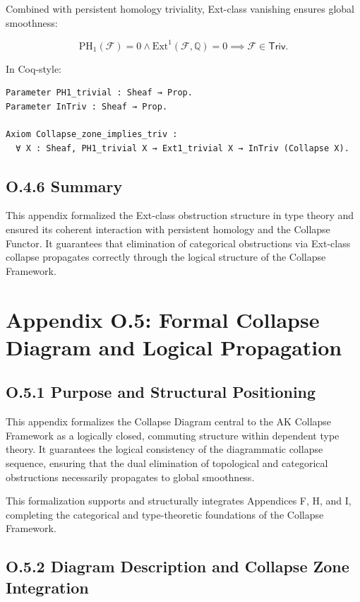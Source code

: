 \documentclass[11pt]{article}
\begin{document}
Combined with persistent homology triviality, Ext-class vanishing ensures global smoothness:

\[
\mathrm{PH}_1(\mathcal{F}) = 0 \land \mathrm{Ext}^1(\mathcal{F}, \mathbb{Q}) = 0 \implies \mathcal{F} \in \mathsf{Triv}.
\]

In Coq-style:

\begin{lstlisting}[language=Coq]
Parameter PH1_trivial : Sheaf → Prop.
Parameter InTriv : Sheaf → Prop.

Axiom Collapse_zone_implies_triv :
  ∀ X : Sheaf, PH1_trivial X → Ext1_trivial X → InTriv (Collapse X).
\end{lstlisting}

\subsection*{O.4.6 Summary}

This appendix formalized the Ext-class obstruction structure in type theory and ensured its coherent interaction with persistent homology and the Collapse Functor.  
It guarantees that elimination of categorical obstructions via Ext-class collapse propagates correctly through the logical structure of the Collapse Framework.



\section*{Appendix O.5: Formal Collapse Diagram and Logical Propagation}

\subsection*{O.5.1 Purpose and Structural Positioning}

This appendix formalizes the Collapse Diagram central to the AK Collapse Framework as a logically closed, commuting structure within dependent type theory.  
It guarantees the logical consistency of the diagrammatic collapse sequence, ensuring that the dual elimination of topological and categorical obstructions necessarily propagates to global smoothness.

This formalization supports and structurally integrates Appendices F, H, and I, completing the categorical and type-theoretic foundations of the Collapse Framework.

\subsection*{O.5.2 Diagram Description and Collapse Zone Integration}
\end{document}
